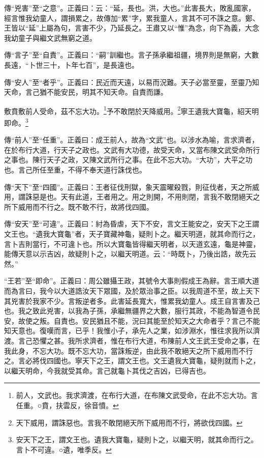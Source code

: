 {\noindent\zhuan{}\fzbyks 傳“兇害”至“之意”。正義曰：云：“延，長也。洪，大也。”此害長大，敗亂國家，經言惟我幼童人，謂損累之，故傳加“累”字，累我童人，言其不可不誅之意。鄭、王皆以“延”上屬為句，言害不少，乃延長之。王肅又以“惟”為念，向下為義，大念我幼童子與繼文武無窮之道。 \par}

{\noindent\zhuan{}\fzbyks 傳“言子”至“自責”。正義曰：“嗣”訓繼也。言子孫承繼祖疆，境界則是無窮，大數長遠，“卜世三十，卜年七百”，是長遠也。 \par}

{\noindent\zhuan{}\fzbyks 傳“安人”至“者乎”。正義曰：民近而天遠，以易而況難。天子必當至靈，至靈乃知天命，言己猶不能安民，明其不知天命。自責而謙。 \par}

敷賁敷前人受命，茲不忘大功。\footnote{前人，文武也。我求濟渡，在布行大道，在布陳文武受命，在此不忘大功。言任重。○賁，扶雲反，徐音憤。}予不敢閉於天降威用。\footnote{天下威用，謂誅惡也。言我不敢閉絕天所下威用而不行，將欲伐四國。}寧王遺我大寶龜，紹天明即命。\footnote{安天下之王，謂文王也。遺我大寶龜，疑則卜之，以繼天明，就其命而行之。言卜不可違。○遺，唯季反。}

{\noindent\zhuan{}\fzbyks 傳“前人”至“任重”。正義曰：成王前人，故為“文武”也。以涉水為喻，言求濟者，在於布行大道，行天子之政也。文武有大功德，故受天命，又當布陳文武受命所行之事也。陳行天子之政，又陳文武所行之事。在此不忘大功。“大功”，大平之功也。言己所任至重，不得不奉天道行誅伐也。 \par}

{\noindent\zhuan{}\fzbyks 傳“天下”至“四國”。正義曰：王者征伐刑獄，象天震曜殺戮，則征伐者，天之所威用，謂誅惡是也。天有此道，王者用之。用之則開，不用則閉，言我不敢閉絕天之所下威用而不行之。既不敢不行，故將伐四國。 \par}

{\noindent\zhuan{}\fzbyks 傳“安天”至“可違”。正義曰：紂為昏虐，天下不安，言文王能安之，安天下之王謂文王也。“遺我大寶龜”者，天子寶藏神龜，疑則卜之。繼天明道，就其命而行之，言卜吉則當行，不可違卜也。所以大寶龜皆得繼天明者，以天道玄遠，龜是神靈，能傳天意以示吉凶，故疑則卜之，以繼天明道。云：“時既卜，乃後出誥，故先云然。” \par}

{\noindent\shu{}\fzkt “王若”至“即命”。正義曰：周公雖攝王政，其號令大事則假成王為辭。言王順大道而為言曰，我今以大道誥汝天下眾國，及於眾治事之臣。以我周道不至，故上天下其兇害於我家不少。言叛逆者多。此害延長寬大，惟累我幼童人。成王自言害及己也。我之致此兇害，以我為子孫，承繼無疆界之大數，服行其政，不能為智道令民安，故使之叛。自責也。安民猶且不能，況曰其能至於知天之大命者乎？言己不能知天意也。復嘆而言，已乎！我惟小子，承先人之業，如涉淵水，惟往求我所以濟渡。言己恐懼之甚。我所求濟者，惟在布行大道，布陳前人文王武王受命之事，在我此身，不忘大功。既不忘大功，當誅叛逆，由此我不敢絕天之所下威用而不行之。言必將伐四國也。寧天下之王，謂文王也。文王遺我大寶龜，疑則就而卜之，以繼天明命，今我就受其命。言己就龜卜其伐之吉凶，已得吉也。 \par}

